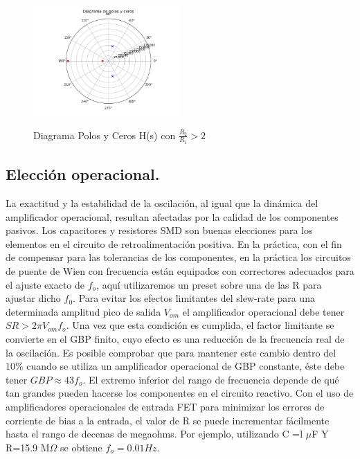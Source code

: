 \begin{figure}[H]
	\centering
\includegraphics[width=0.5\textwidth]{Imagenes-Ej1/Hrmn1.png}
	\label{fig:poleZeroDiagHsmax}
	\caption{Diagrama Polos y Ceros H(s) con $\frac{R_2}{R_1}>2$}
\end{figure}
\subsection{Elección operacional.}

La exactitud y la estabilidad de la oscilación, al igual que la dinámica del amplificador operacional, resultan
afectadas por la calidad de los componentes pasivos. Los capacitores  y 
resistores SMD  son buenas elecciones para los elementos en el circuito de
retroalimentación positiva. En la práctica, con el fin de compensar para las tolerancias de
los componentes, en la práctica los circuitos de puente de Wien con frecuencia están equipados con correctores adecuados para el ajuste exacto de $f_o$, aquí utilizaremos un preset sobre una de las R para ajustar dicho $f_0$. 
Para evitar los efectos limitantes del slew-rate para una determinada
amplitud pico de salida $V_{om}$ el amplificador operacional debe tener $SR > 2\pi V_{om} f_o$. Una vez que esta
condición es cumplida, el factor limitante se convierte en el GBP finito, cuyo efecto es
una reducción de la frecuencia real de la oscilación. Es posible comprobar que para
mantener este cambio dentro del $10\%$ cuando se utiliza un amplificador operacional de GBP constante, éste
debe tener $GBP \approx 43 f_o$.
El extremo inferior del rango de frecuencia depende de qué tan grandes pueden hacerse los componentes en el circuito reactivo. Con el uso de amplificadores operacionales de entrada FET para
minimizar los errores de corriente de bias a la entrada, el valor de R se puede
incrementar fácilmente hasta el rango de decenas de megaohms. Por ejemplo, utilizando C =l $\mu$F Y R=15.9 M$\Omega$ se obtiene $f_o =0.01 Hz$.\\

